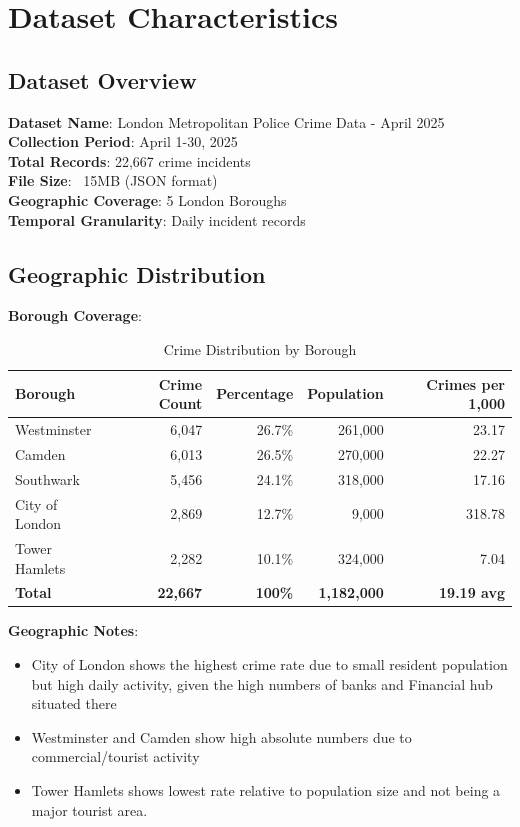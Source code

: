\documentclass[12pt,a4paper]{article}
\begin{document}
\section{Dataset Characteristics}

\subsection{Dataset Overview}

\textbf{Dataset Name}: London Metropolitan Police Crime Data - April 2025\\
\textbf{Collection Period}: April 1-30, 2025\\
\textbf{Total Records}: 22,667 crime incidents\\
\textbf{File Size}: ~15MB (JSON format)\\
\textbf{Geographic Coverage}: 5 London Boroughs\\
\textbf{Temporal Granularity}: Daily incident records

\subsection{Geographic Distribution}

\textbf{Borough Coverage}:

\begin{table}[h]
\centering
\caption{Crime Distribution by Borough}
\begin{tabular}{@{}lrrrr@{}}
\toprule
Borough & Crime Count & Percentage & Population & Crimes per 1,000 \\
\midrule
Westminster & 6,047 & 26.7\% & 261,000 & 23.17 \\
Camden & 6,013 & 26.5\% & 270,000 & 22.27 \\
Southwark & 5,456 & 24.1\% & 318,000 & 17.16 \\
City of London & 2,869 & 12.7\% & 9,000 & 318.78 \\
Tower Hamlets & 2,282 & 10.1\% & 324,000 & 7.04 \\
\textbf{Total} & \textbf{22,667} & \textbf{100\%} & \textbf{1,182,000} & \textbf{19.19 avg} \\
\bottomrule
\end{tabular}
\end{table}

\textbf{Geographic Notes}:
\begin{itemize}
    \item City of London shows the highest crime rate due to small resident population but high daily activity, given the high numbers of banks and Financial
    hub situated there
    \item Westminster and Camden show high absolute numbers due to commercial/tourist activity
    \item Tower Hamlets shows lowest rate relative to population size and not being a major tourist area.
\end{itemize}
\end{document}
